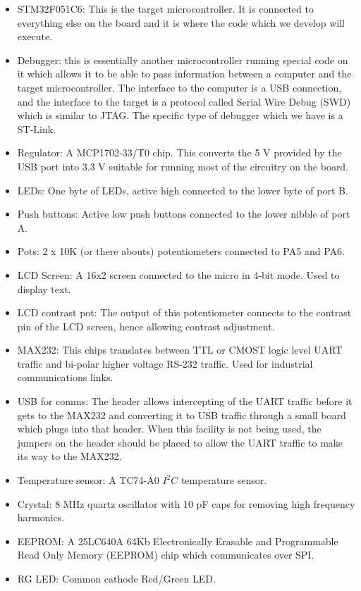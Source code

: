 \begin{itemize}
  \item STM32F051C6: This is the target microcontroller. It is connected to everything else on the board and it is where the code which we develop will execute. 
  \item Debugger: this is essentially another microcontroller running special code on it which allows it to be able to pass information between a computer and the target microcontroller. The interface to the computer is a USB connection, and the interface to the target is a protocol called Serial Wire Debug (SWD) which is similar to JTAG. The specific type of debugger which we have is a ST-Link.
  \item Regulator: A MCP1702-33/T0 chip. This converts the 5 V provided by the USB port into 3.3 V suitable for running most of the circuitry on the board. 
  \item LEDs: One byte of LEDs, active high connected to the lower byte of port B.
  \item Push buttons: Active low push buttons connected to the lower nibble of port A.
  \item Pots: 2 x 10K (or there abouts) potentiometers connected to PA5 and PA6.
  \item LCD Screen: A 16x2 screen connected to the micro in 4-bit mode. Used to display text.
  \item LCD contrast pot: The output of this potentiometer connects to the contrast pin of the LCD screen, hence allowing contrast adjustment.
  \item MAX232: This chips translates between TTL or CMOST logic level UART traffic and bi-polar higher voltage RS-232 traffic. Used for industrial communications links.
  \item USB for comms: The header allows intercepting of the UART traffic before it gets to the MAX232 and converting it to USB traffic through a small board which plugs into that header. When this facility is not being used, the jumpers on the header should be placed to allow the UART traffic to make its way to the MAX232.
  \item Temperature sensor: A TC74-A0 $I^2C$ temperature sensor.
  \item Crystal: 8 MHz quartz oscillator with 10 pF caps for removing high frequency harmonics. 
  \item EEPROM: A 25LC640A 64Kb Electronically Erasable and Programmable Read Only Memory (EEPROM) chip which communicates over SPI.
  \item RG LED: Common cathode Red/Green LED.
\end{itemize}


